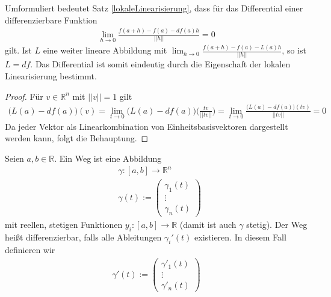 \begin{Bemerkung}
\label{differentialeindeutig}
Umformuliert bedeutet Satz \ref{lokaleLinearisierung}, dass für das Differential einer differenzierbare Funktion
\begin{align}
\lim_{h \to 0} \frac{f(a + h) -f(a) - df(a) h }{||h||} = 0
\end{align}
gilt. Ist $L$ eine weiter lineare Abbildung mit $\lim_{h \to 0} \frac{f(a + h) -f(a) - L(a) h }{||h||}$, so ist $L = df$. Das Differential ist somit eindeutig durch die Eigenschaft der lokalen Linearisierung bestimmt.
\end{Bemerkung}
\begin{proof}
Für $v \in \mathbb{R}^n$ mit $||v|| = 1$ gilt 
\begin {align*}
\bigl( L(a) - df(a) \bigr)(v) =  \lim_{t \to 0}  \bigl( L(a) - df(a) \bigr) \bigl( \frac{tv}{||tv||} \bigr) = \lim_{t \to 0} \frac{\bigl( L(a) - df(a) \bigr)(tv) }{||tv||} = 0
\end{align*}
Da jeder Vektor als Linearkombination von Einheitsbasisvektoren dargestellt werden kann, folgt die Behauptung.
\end{proof}

\begin{Definition}
Seien $a,b \in \mathbb{R}$. Ein Weg ist eine Abbildung  
\begin{align*}
& \gamma:  [a,b] \to \mathbb{R}^n \\
& \gamma (t) :=  \begin{pmatrix} \gamma_1(t) \\ \vdots \\ \gamma_n(t) \end{pmatrix}
\end{align*}
mit reellen, stetigen Funktionen $y_i : [a,b] \to \mathbb{R}$ (damit ist auch $\gamma$ stetig). Der Weg heißt differenzierbar, falls alle Ableitungen $\gamma_i'(t)$ existieren. In diesem Fall definieren wir
\begin{align*}
 \gamma' (t) :=  \begin{pmatrix} \gamma'_1(t) \\ \vdots \\ \gamma'_n(t) \end{pmatrix}
\end{align*}
\end{Definition}

